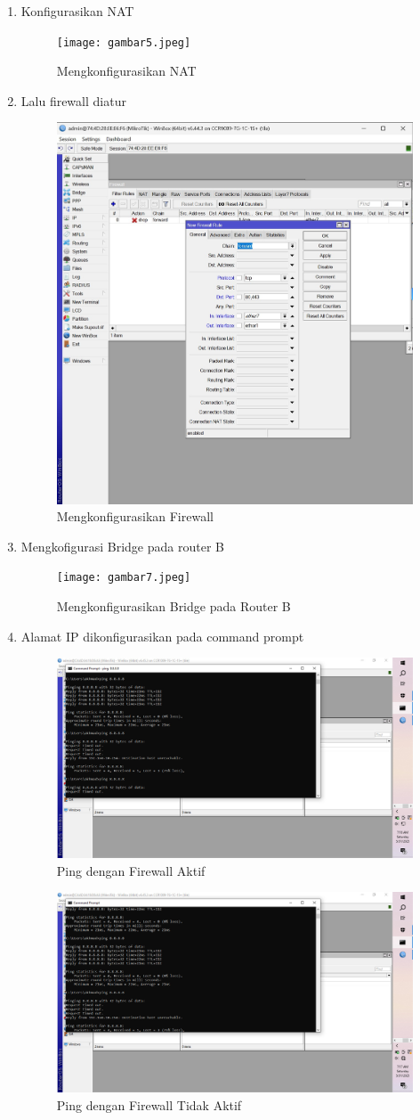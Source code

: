 \begin{enumerate}
    \item Konfigurasikan NAT
    \begin{figure}[H]
        \centering
        \texttt{[image: gambar5.jpeg]}
        \caption{Mengkonfigurasikan NAT}
        \label{fig:mengkonfigurasikan-NAT}
    \end{figure}
    \item Lalu firewall diatur
    \begin{figure}[H]
        \centering
        \includegraphics[width=0.5\linewidth]{gambar6.jpeg}
        \caption{Mengkonfigurasikan Firewall}
        \label{fig:mengkonfigurasikan-firewall}
    \end{figure}
    \item Mengkofigurasi Bridge pada router B 
    \begin{figure}[H]
        \centering
        \texttt{[image: gambar7.jpeg]}
        \caption{Mengkonfigurasikan Bridge pada Router B}
        \label{fig:mengkonfigurasikan-bridge-router-B}
    \end{figure}
    \item Alamat IP dikonfigurasikan pada command prompt
    \begin{figure}[H]
        \centering
        \includegraphics[width=0.5\linewidth]{gambar8a.jpeg}
        \caption{Ping dengan Firewall Aktif}
        \label{fig:ping-saat-firewall-aktif}
    \end{figure}

    \begin{figure}[H]
        \centering
        \includegraphics[width=0.5\linewidth]{gambar8b.jpeg}
        \caption{Ping dengan Firewall Tidak Aktif}
        \label{fig:ping-saat-firewall-tidak-aktif}
    \end{figure}


\end{enumerate}
